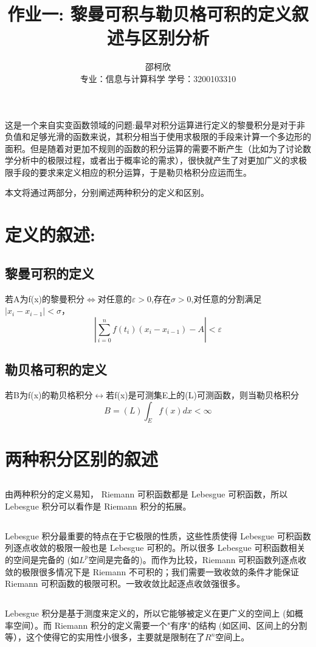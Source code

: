 \documentclass{ctexart}
\title{作业一: 黎曼可积与勒贝格可积的定义叙述与区别分析}
\author{邵柯欣 \\ 专业：信息与计算科学  学号：3200103310}
\begin{document}
\maketitle


这是一个来自实变函数领域的问题:最早对积分运算进行定义的黎曼积分是对于非负值和足够光滑的函数来说，其积分相当于使用求极限的手段来计算一个多边形的面积。但是随着对更加不规则的函数的积分运算的需要不断产生（比如为了讨论数学分析中的极限过程，或者出于概率论的需求），很快就产生了对更加广义的求极限手段的要求来定义相应的积分运算，于是勒贝格积分应运而生。\par
本文将通过两部分，分别阐述两种积分的定义和区别。

\section{定义的叙述:}

\subsection{黎曼可积的定义}

若A为f(x)的黎曼积分$\Longleftrightarrow$对任意的$\varepsilon>0$,存在$\sigma>0$,对任意的分割满足$|x_i-x_{i-1}|<\sigma$，
\begin{equation}
|\sum_{i=0}^nf(t_i)(x_i-x_{i-1})-A|<\varepsilon \label{pythagorean}
\end{equation}

\subsection{勒贝格可积的定义}

若B为f(x)的勒贝格积分$\longleftrightarrow$若f(x)是可测集E上的(L)可测函数，则当勒贝格积分
\begin{equation}
  B=(L)\int_Ef(x)dx<\infty \label{pythagorean}
\end{equation}
\newpage
\section{两种积分区别的叙述}

\subsection{}
由两种积分的定义易知， Riemann 可积函数都是 Lebesgue 可积函数，所以 Lebesgue 积分可以看作是 Riemann 积分的拓展。

\subsection{}
Lebesgue 积分最重要的特点在于它极限的性质，这些性质使得 Lebesgue 可积函数列逐点收敛的极限一般也是 Lebesgue 可积的。所以很多 Lebesgue 可积函数相关的空间是完备的 (如$L^p$空间是完备的)。而作为比较，Riemann 可积函数列逐点收敛的极限很多情况下是 Riemann 不可积的；我们需要一致收敛的条件才能保证 Riemann 可积函数的极限可积。一致收敛比起逐点收敛强很多。

\subsection{}
Lebesgue 积分是基于测度来定义的，所以它能够被定义在更广义的空间上 (如概率空间）。而 Riemann 积分的定义需要一个"有序"的结构 (如区间、区间上的分割等），这个使得它的实用性小很多，主要就是限制在了$R^n$空间上。
\end{document}
